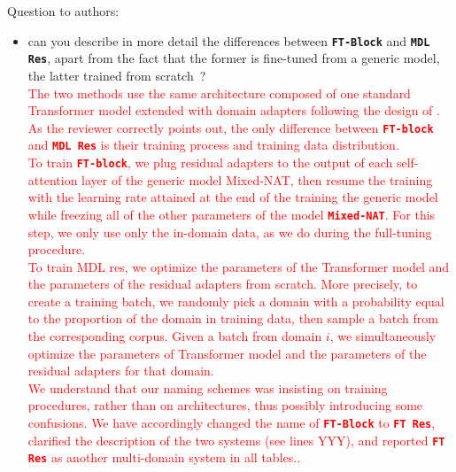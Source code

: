 \documentclass[12pt,times,a4paper,twoside]{article}
\newcommand{\fyTodo}[1]{\Todo[FY:]{\textcolor{orange}{#1}}}
\theoremstyle{definition}
\newcommand{\system}[1]{\texttt{\textbf{#1}}}
\begin{document}
\noindent Question to authors:
\begin{itemize}
\item can you describe in more detail the differences between \system{FT-Block} and \system{MDL Res}, apart from the fact that the former is fine-tuned from a generic model, the latter trained from scratch~?
  \\
  \textcolor{red}{%
    The two methods use the same architecture composed of one standard Transformer model extended with domain adapters following the design of \cite{Bapna19simple}. As the reviewer correctly points out, the only difference between \system{FT-block} and \system{MDL Res} is their training process and training data distribution.
    \\
    To train \system{FT-block}, we plug residual adapters to the output of each self-attention layer of the generic model Mixed-NAT, then resume the training with the learning rate attained at the end of the training the generic model while freezing all of the other parameters of the model \system{Mixed-NAT}. For this step, we only use only the in-domain data, as we do during the full-tuning procedure.
    \\
    To train MDL res, we optimize the parameters of the Transformer model and the parameters of the residual adapters from scratch. More precisely, to create a training batch, we randomly pick a domain with a probability equal to the proportion of the domain in training data, then sample a batch from the corresponding corpus. Given a batch from domain $i$, we simultaneously optimize the parameters of Transformer model and the parameters of the residual adapters for that domain.
    \\
    We understand that our naming schemes was insisting on training procedures, rather than on architectures, thus possibly introducing some confusions. We have accordingly changed the name of \system{FT-Block} to \system{FT Res}, clarified the description of the two systems (see lines YYY\fyTodo{fix this}), and reported \system{FT Res}\fyTodo{or new name} as another multi-domain system in all tables.\fyTodo{Make sure it is the case}.}
\end{itemize}
\end{document}
